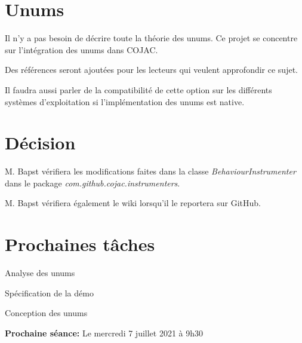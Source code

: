 \documentclass[11pt]{meetingmins}
\begin{document}
\section{Unums}
\begin{hiddenitems}
    \item Il n'y a pas besoin de décrire toute la théorie des unums. Ce projet se concentre sur l'intégration des unums dans COJAC.
    \item Des références seront ajoutées pour les lecteurs qui veulent approfondir ce sujet.
    \item Il faudra aussi parler de la compatibilité de cette option sur les différents systèmes d'exploitation si l'implémentation des unums est native.
\end{hiddenitems}

\section{Décision}
\begin{hiddenitems}
    \item M. Bapst vérifiera les modifications faites dans la classe \textit{BehaviourInstrumenter} dans le package \textit{com.github.cojac.instrumenters}.
    \item M. Bapst vérifiera également le wiki lorsqu'il le reportera sur GitHub.
\end{hiddenitems}

\section{Prochaines tâches}
\begin{hiddenitems}
    \item Analyse des unums
    \item Spécification de la démo
    \item Conception des unums
\end{hiddenitems}

\vspace{1em}
\par \noindent \textbf {Prochaine séance:} Le mercredi 7 juillet 2021 à 9h30
\end{document}
